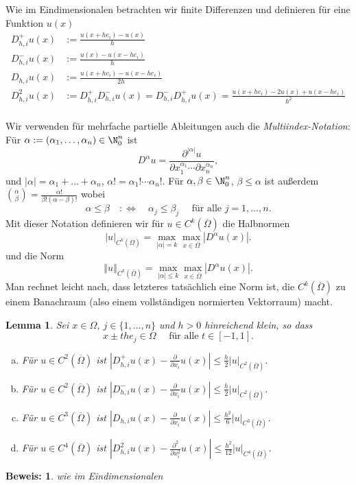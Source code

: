 \documentclass[
]{mycourse}
\theoremstyle{mythm}
\newtheorem{lemma}[theorem]{Lemma}
\theoremstyle{break}
\newtheorem*{beweis}{Beweis:}
\newcommand{\DS}{\displaystyle}
\newcommand{\norm}[1]{\left\Vert#1\right\Vert}		%
\begin{document}
Wie im Eindimensionalen betrachten wir finite Differenzen und definieren für eine Funktion $u(x)$
\begin{align*}
D_{h,i}^{+} u(x)&:=\frac{u(x+he_i)-u(x)}{h}\\
D_{h,i}^{-} u(x)&:=\frac{u(x)-u(x-he_i)}{h}\\
D_{h,i} u(x)&:=\frac{u(x+he_i)-u(x-he_i)}{2h}\\
D_{h,i}^2 u(x)&:=D_{h,i}^{+} D_{h,i}^{-}  u(x)= D_{h,i}^{-} D_{h,i}^{+}  u(x)=  \frac{u(x+he_i)-2u(x) + u(x-he_i)}{h^2}\\
\end{align*}

Wir verwenden für mehrfache partielle Ableitungen auch die \emph{Multiindex-Notation}: Für $\alpha:=(\alpha_1,\ldots,\alpha_n)\in \N_0^n$ ist
\[
D^\alpha u=\frac{\partial^{|\alpha|}u}{\partial x_1^{\alpha_1}\cdots \partial x_n^{\alpha_n}},
\]
und $|\alpha|=\alpha_1+\ldots+\alpha_n$, $\alpha!=\alpha_1!\cdots \alpha_n!$. Für
$\alpha, \beta \in \N_0^n$, $\beta\leq \alpha$ ist außerdem ${\alpha \choose \beta}=\frac{\alpha!}{\beta!(\alpha-\beta)!}$ wobei
\[
\alpha\leq \beta \quad :\Longleftrightarrow \quad
\alpha_j\leq \beta_j \quad \mbox{ für alle } j=1,\ldots,n.
\]
Mit dieser Notation definieren wir für $u\in C^k(\overline\Omega)$ die Halbnormen
\[
|u|_{C^k(\overline\Omega)}=\max_{|\alpha|= k} \max_{x\in \overline\Omega} |D^\alpha u(x)|.
\]
und die Norm 
\[
\norm{u}_{C^k(\overline\Omega)}=\max_{|\alpha|\leq k} \max_{x\in \overline\Omega} |D^\alpha u(x)|.
\]
Man rechnet leicht nach, dass letzteres tatsächlich eine Norm ist, die $C^k(\overline\Omega)$ 
zu einem Banachraum (also einem vollständigen normierten Vektorraum) macht.

\begin{lemma}\label{lemma:FD_konsistenz1}
Sei $x\in \Omega$, $j\in \{1,\ldots,n \}$ und $h>0$ hinreichend klein, so dass 
\[
x\pm t h e_j\in \Omega \quad \mbox{ für alle } t\in [-1,1].
\]
\begin{enumerate}[(a)]
\item Für $u\in C^2(\overline\Omega)$ ist $\DS \left| D_{h,i}^{+} u(x) - \frac{\partial}{\partial x_i}u(x)\right| \leq \frac{h}{2} |u|_{C^2(\overline\Omega)}$.
\item Für $u\in C^2(\overline\Omega)$ ist $\DS \left| D_{h,i}^{-} u(x) - \frac{\partial}{\partial x_i}u(x)\right| \leq \frac{h}{2} |u|_{C^2(\overline\Omega)}$.
\item Für $u\in C^3(\overline\Omega)$ ist $\DS \left| D_{h,i} u(x) - \frac{\partial}{\partial x_i}u(x)\right| \leq \frac{h^2}{6} |u|_{C^3(\overline\Omega)}$.
\item Für $u\in C^4(\overline\Omega)$ ist $\DS \left| D_{h,i}^2 u(x) - \frac{\partial^2}{\partial x_i^2}u(x)\right| \leq \frac{h^2}{12} |u|_{C^4(\overline\Omega)}$.
\end{enumerate}
\end{lemma}
\begin{beweis}
wie im Eindimensionalen
\end{beweis}
\end{document}
